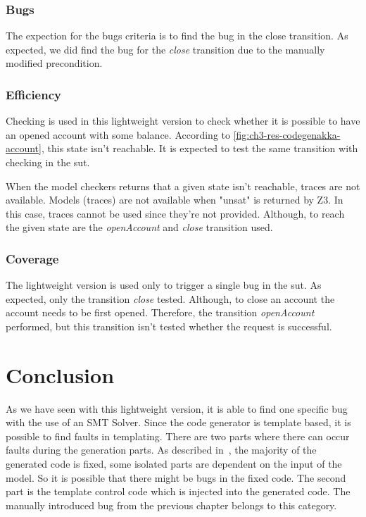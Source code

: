 \subsubsection{Bugs}
The expection for the bugs criteria is to find the bug in the close transition.
As expected, we did find the bug for the \textit{close}
transition due to the manually modified precondition.

\subsubsection{Efficiency}

Checking is used in this lightweight version to check whether it is possible
to have an opened account with some balance. According to
\autoref{fig:ch3-res-codegenakka-account}, this state isn't reachable. It is
expected to test the same transition with checking in the \gls{sut}.

When the model checkers returns that a given state isn't reachable,
traces are not available. Models (traces) are not available when "unsat" is
returned by Z3.
In this case, traces cannot be used since they're not provided. Although, to
reach the given state are the \textit{openAccount} and \textit{close} transition
used.


\subsubsection{Coverage}
The lightweight version is used only to trigger a single bug in the \gls{sut}. As
expected, only the transition \textit{close} tested. Although, to close an
account the account needs to be first opened. Therefore, the transition
\textit{openAccount} performed, but this transition isn't tested whether the
request is successful.

\section{Conclusion}

As we have seen with this lightweight version, it is able to find one specific bug with the use of an SMT Solver. Since the code generator is template based, it is possible to find faults in templating. There are two parts where there can occur faults during the generation parts. As described in~\cite[p.274]{voelter2013dsl}, the majority of the generated code is fixed, some isolated parts are dependent on the input of the model. So it is possible that there might be bugs in the fixed code. The second part is the template control code which is injected into the generated code. The manually introduced bug from the previous chapter belongs  to this category.


